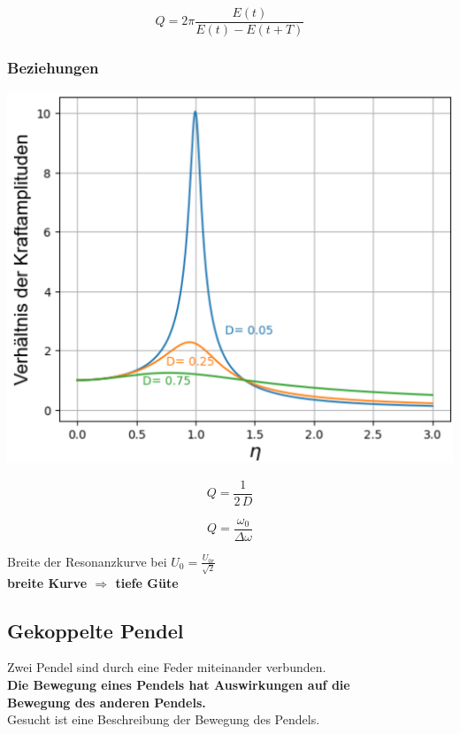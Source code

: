 $$ \boxed{ Q = 2 \pi \frac{E(t)}{E(t) - E(t + T)} }$$ 



\subsubsection{Beziehungen}

\begin{minipage}{0.4\linewidth}
\includegraphics[width=0.95\linewidth]{Bilder/Wellen-Optik/guete_resonanz} 
\end{minipage}
\hfill
\begin{minipage}{0.58\linewidth}

\begin{minipage}{0.48\linewidth}
$$ \boxed{Q = \frac{1}{2 \, D} } $$ 
\end{minipage}
\hfill
\begin{minipage}{0.48\linewidth}
$$ \boxed{ Q = \frac{\omega_0}{\Delta \omega} } $$
\end{minipage}

\vspace{0.2cm}

Breite der Resonanzkurve bei $U_0 = \frac{U_{0r}}{\sqrt{2}}$ \\


\textbf{breite Kurve $\Rightarrow$ tiefe Güte}
\end{minipage}



\subsection{Gekoppelte Pendel}
Zwei Pendel sind durch eine Feder miteinander verbunden. \\
\textbf{Die Bewegung eines Pendels hat Auswirkungen auf die \\
Bewegung des anderen Pendels.} \\
Gesucht ist eine Beschreibung der Bewegung des Pendels. \\


